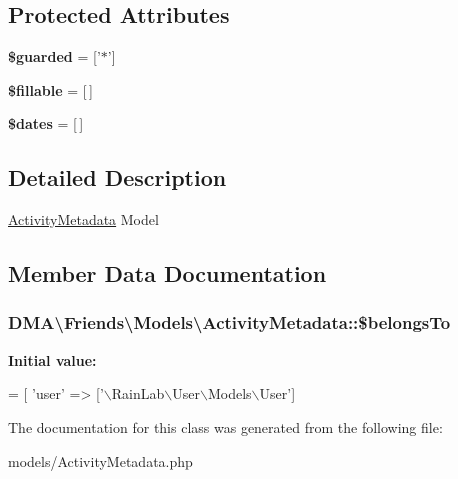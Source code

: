 \subsection*{Protected Attributes}
\begin{DoxyCompactItemize}
\item 
\hypertarget{classDMA_1_1Friends_1_1Models_1_1ActivityMetadata_ae295fa39a4e26ba207f9c606a9348957}{{\bfseries \$guarded} = \mbox{[}'$\ast$'\mbox{]}}\label{classDMA_1_1Friends_1_1Models_1_1ActivityMetadata_ae295fa39a4e26ba207f9c606a9348957}

\item 
\hypertarget{classDMA_1_1Friends_1_1Models_1_1ActivityMetadata_a057b7754ecf2cacfa7be3fa003cae61e}{{\bfseries \$fillable} = \mbox{[}$\,$\mbox{]}}\label{classDMA_1_1Friends_1_1Models_1_1ActivityMetadata_a057b7754ecf2cacfa7be3fa003cae61e}

\item 
\hypertarget{classDMA_1_1Friends_1_1Models_1_1ActivityMetadata_a88007f604baf0815d66368f4dbdf88aa}{{\bfseries \$dates} = \mbox{[}$\,$\mbox{]}}\label{classDMA_1_1Friends_1_1Models_1_1ActivityMetadata_a88007f604baf0815d66368f4dbdf88aa}

\end{DoxyCompactItemize}


\subsection{Detailed Description}
\hyperlink{classDMA_1_1Friends_1_1Models_1_1ActivityMetadata}{Activity\-Metadata} Model 

\subsection{Member Data Documentation}
\hypertarget{classDMA_1_1Friends_1_1Models_1_1ActivityMetadata_a41b080a3ea1f2019d7695e7825b449fe}{
\subsubsection[{\$belongs\-To}]{\setlength{\rightskip}{0pt plus 5cm}D\-M\-A\textbackslash{}\-Friends\textbackslash{}\-Models\textbackslash{}\-Activity\-Metadata\-::\$belongs\-To}}\label{classDMA_1_1Friends_1_1Models_1_1ActivityMetadata_a41b080a3ea1f2019d7695e7825b449fe}
{\bfseries Initial value\-:}
\begin{DoxyCode}
= [
        \textcolor{stringliteral}{'user'}      => [\textcolor{stringliteral}{'\(\backslash\)RainLab\(\backslash\)User\(\backslash\)Models\(\backslash\)User'}]
\end{DoxyCode}


The documentation for this class was generated from the following file\-:\begin{DoxyCompactItemize}
\item 
models/Activity\-Metadata.\-php\end{DoxyCompactItemize}
